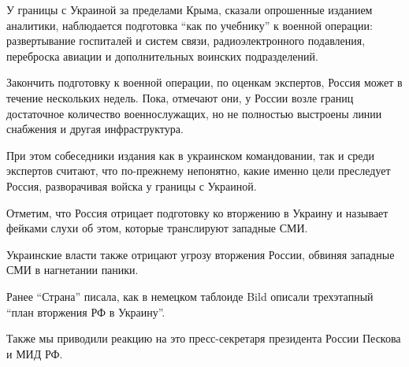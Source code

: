 У границы с Украиной за пределами Крыма, сказали опрошенные изданием аналитики,
наблюдается подготовка \enquote{как по учебнику} к военной операции: развертывание
госпиталей и систем связи, радиоэлектронного подавления, переброска авиации и
дополнительных воинских подразделений.

Закончить подготовку к военной операции, по оценкам экспертов, Россия может в
течение нескольких недель. Пока, отмечают они, у России возле границ
достаточное количество военнослужащих, но не полностью выстроены линии
снабжения и другая инфраструктура.

При этом собеседники издания как в украинском командовании, так и среди
экспертов считают, что по-прежнему непонятно, какие именно цели преследует
Россия, разворачивая войска у границы с Украиной.

Отметим, что Россия отрицает подготовку ко вторжению в Украину и называет
фейками слухи об этом, которые транслируют западные СМИ.

Украинские власти также отрицают угрозу вторжения России, обвиняя западные СМИ
в нагнетании паники.

Ранее \enquote{Страна} писала, как в немецком таблоиде Bild описали трехэтапный \enquote{план
вторжения РФ в Украину}.

Также мы приводили реакцию на это пресс-секретаря президента России Пескова и
МИД РФ.
